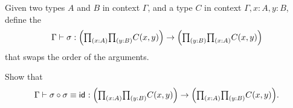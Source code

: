 \begin{exercises}
\begin{subexenum}
\begin{prooftree}
\end{prooftree}
\end{subexenum}
\item \label{ex:swap}
\begin{subexenum}
\item Given two types $A$ and $B$ in context $\Gamma$, and a type $C$ in context $\Gamma,x:A,y:B$, define the 
\begin{equation*}
\Gamma\vdash \sigma:\Big(\prd{x:A}{y:B}C(x,y)\Big)\to\Big(\prd{y:B}{x:A}C(x,y)\Big)
\end{equation*}
that swaps the order of the arguments.
\item Show that
\begin{equation*}
\Gamma\vdash \sigma\circ\sigma\jdeq\idfunc:\Big(\prd{x:A}{y:B}C(x,y)\Big)\to \Big(\prd{x:A}{y:B}C(x,y)\Big).
\end{equation*}
\end{subexenum}
\end{exercises}
